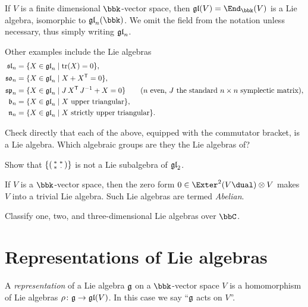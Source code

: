\begin{example}
    If $V$ is a finite dimensional $\bbk$-vector space, then $\gl(V) =
    \End_\bbk(V)$ is a Lie algebra, isomorphic to $\gl_n(\bbk)$. We omit the
    field from the notation unless necessary, thus simply writing $\mathfrak{gl}_n$. 

    Other examples include the Lie algebras 
    \begin{align*}
        \mathfrak{sl}_n &= \{X\in\mathfrak{gl}_n\;|\; \text{tr}(X)=0\}, \\ 
        \mathfrak{so}_n &= \{X\in \mathfrak{gl}_n\;|\; X + X^{\mathsf{T}} = 0\}, \\ 
        \mathfrak{sp}_{n} &= \{ X\in \mathfrak{gl}_n\;|\; J\, X^{\mathsf{T}}\, J^{-1} + X = 0\} \qquad
        (n \text{ even, } J\text{ the standard }n\times n\text{ symplectic
        matrix}), \\ 
        \mathfrak{b}_n &= \{X \in \mathfrak{gl}_n\;|\; X \text{ upper triangular}\}, \\ 
        \mathfrak{n}_n &= \{X \in \mathfrak{gl}_n\;|\; X \text{ strictly upper triangular}\}.
    \end{align*}
\end{example}

\begin{exercise} 
    Check directly that each of the above, equipped with the commutator bracket,
    is a Lie algebra. Which algebraic groups are they the Lie algebras of?
\end{exercise}

\begin{exercise}
    Show that $\{\left(\begin{smallmatrix} \ast & \ast \\ \ast & \cdot \end{smallmatrix}\right)\}$ is not a Lie subalgebra of
    $\mathfrak{gl}_2$.
\end{exercise}

\begin{example}
    If $V$ is a $\bbk$-vector space, then the zero form $0\in \Exter^2
    (V\dual)\otimes V$ makes $V$ into a trivial Lie algebra. Such Lie algebras
    are termed \emph{Abelian}. 
\end{example}

\begin{exercise}
    Classify one, two, and three-dimensional Lie algebras over $\bbC$.
\end{exercise}

\section{Representations of Lie algebras}

\begin{definition}
    A \emph{representation} of a Lie algebra $\mathfrak{g}$ on a $\bbk$-vector space $V$ is a
    homomorphism of Lie algebras $\rho \colon \mathfrak{g}\to \mathfrak{gl}(V)$. In this case we
    say ``$\mathfrak{g}$ acts on $V$''.
\end{definition}

